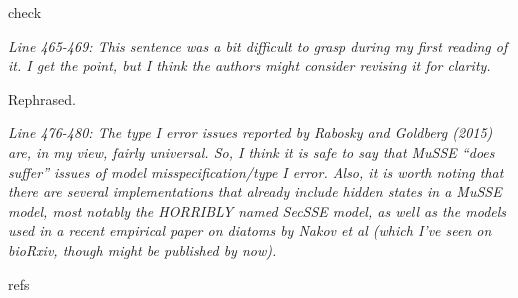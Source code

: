 \documentclass[11pt]{article}
\renewenvironment{quote}{\bigskip\noindent\itshape\ignorespaces}{\smallskip}
\begin{document}
check %


\begin{quote}
Line 465-469: This sentence was a bit difficult to grasp during my first reading of it.
I get the point, but I think the authors might consider revising it for clarity.
\end{quote}

Rephrased. %

\begin{quote}
Line 476-480: The type I error issues reported by Rabosky and Goldberg (2015) are, in my view, fairly universal.
So, I think it is safe to say that MuSSE ``does suffer'' issues of model misspecification/type I error.
Also, it is worth noting that there are several implementations that already include hidden states in a MuSSE model, most notably the HORRIBLY named SecSSE model, as well as the models used in a recent empirical paper on diatoms by Nakov et al (which I’ve seen on bioRxiv, though might be published by now).
\end{quote}

refs %



\end{document}
